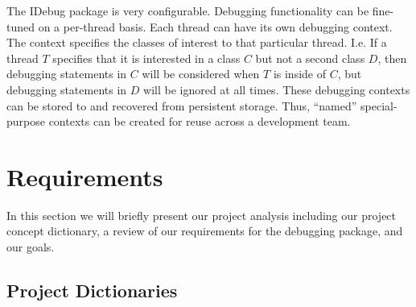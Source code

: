 \documentclass{article}
\begin{document}
The IDebug package is very configurable.  Debugging functionality can
be fine-tuned on a per-thread basis.  Each thread can have its own
debugging context.  The context specifies the classes of interest to
that particular thread.  I.e. If a thread $T$ specifies that it is
interested in a class $C$ but not a second class $D$, then debugging
statements in $C$ will be considered when $T$ is inside of $C$, but
debugging statements in $D$ will be ignored at all times.  These
debugging contexts can be stored to and recovered from persistent
storage.  Thus, ``named'' special-purpose contexts can be created for
reuse across a development team.

\section{Requirements}

In this section we will briefly present our project analysis including
our project concept dictionary, a review of our requirements for the
debugging package, and our goals.

\subsection{Project Dictionaries}
\end{document}

